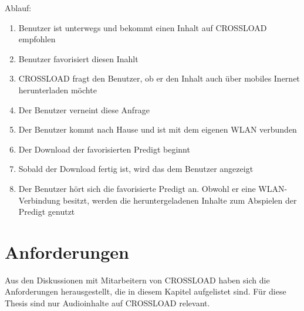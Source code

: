 Ablauf:
\begin{enumerate}
	\item Benutzer ist unterwegs und bekommt einen Inhalt auf CROSSLOAD empfohlen
	\item Benutzer favorisiert diesen Inahlt
	\item CROSSLOAD fragt den Benutzer, ob er den Inhalt auch über mobiles Inernet herunterladen möchte
	\item Der Benutzer verneint diese Anfrage
	\item Der Benutzer kommt nach Hause und ist mit dem eigenen WLAN verbunden
	\item Der Download der favorisierten Predigt beginnt
	\item Sobald der Download fertig ist, wird das dem Benutzer angezeigt
	\item Der Benutzer hört sich die favorisierte Predigt an. Obwohl er eine WLAN-Verbindung besitzt, werden die heruntergeladenen Inhalte zum Abspielen der Predigt genutzt
\end{enumerate}

\section{Anforderungen}
Aus den Diskussionen mit Mitarbeitern von CROSSLOAD haben sich die Anforderungen herausgestellt, die in diesem Kapitel aufgelistet sind. Für diese Thesis sind nur Audioinhalte auf CROSSLOAD relevant.

